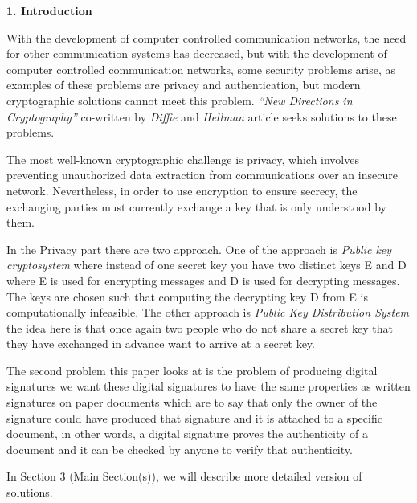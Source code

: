 \documentclass{article}
\begin{document}
\begin{flushleft}
\textbf{1. Introduction} \newline

\hspace{0.5cm} With the development of computer controlled communication networks, the need for other communication systems has decreased, but with the development of computer controlled communication networks, some security problems arise, as examples of these problems are privacy and authentication, but modern cryptographic solutions cannot meet this problem. \textit{“New Directions in Cryptography”} co-written by \textit{Diffie} and \textit{Hellman} article seeks solutions to these problems. \newline

\hspace{0.5cm} The most well-known cryptographic challenge is privacy, which involves preventing unauthorized data extraction from communications over an insecure network. Nevertheless, in order to use encryption to ensure secrecy, the exchanging parties must currently exchange a key that is only understood by them. \newline

\hspace{0.5cm} In the Privacy part there are two approach. One of the approach is \textit{Public key cryptosystem} where instead of one secret key you have two distinct keys E and D where E is used for encrypting messages and D is used for decrypting messages. The keys are chosen such that computing the decrypting key D from E is computationally infeasible. The other approach is \textit{Public Key Distribution System} the idea here is that once again two people who do not share a secret key that they have exchanged in advance want to arrive at a secret key. \newline

\hspace{0.5cm} The second problem this paper looks at is the problem of producing digital signatures we want these digital signatures to have the same properties as written signatures on paper documents which are to say that only the owner of the signature could have produced that signature and it is attached to a specific document, in other words, a digital signature proves the authenticity of a document and it can be checked by anyone to verify that authenticity. \newline

\hspace{0.5cm} In Section 3 (Main Section(s)), we will describe more detailed version of solutions. \newline


\end{flushleft}
\end{document}
